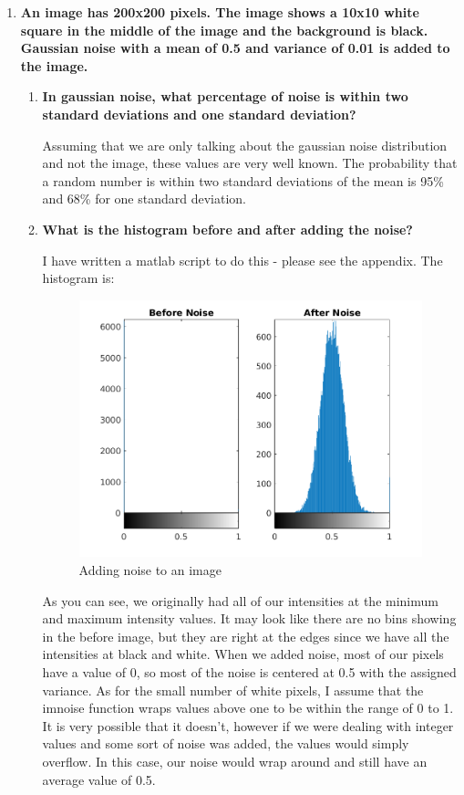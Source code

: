 \begin{enumerate}[font=\bfseries]

    \item \textbf{An image has 200x200 pixels. The image shows a 10x10 white
    square in the middle of the image and the background is black. Gaussian
    noise with a mean of 0.5 and variance of 0.01 is added to the image.}

    \begin{enumerate}[font=\bfseries, label=\alph*.]
	
	\item \textbf{In gaussian noise, what percentage of noise is within two
	standard deviations and one standard deviation?}

	Assuming that we are only talking about the gaussian noise distribution
	and not the image, these values are very well known. The probability
	that a random number is within two standard deviations of the mean is
	95\% and 68\% for one standard deviation.

	\item \textbf{What is the histogram before and after adding the noise?}

	I have written a matlab script to do this - please see the appendix. The
	histogram is:

	\begin{figure}[H]
	    \centering
	    \includegraphics{addnoise.png}
	    \caption{Adding noise to an image}
	\end{figure}

	As you can see, we originally had all of our intensities at the minimum
	and maximum intensity values. It may look like there are no bins showing
	in the before image, but they are right at the edges since we have all
	the intensities at black and white. When we added noise, most of our
	pixels have a value of 0, so most of the noise is centered at 0.5 with
	the assigned variance. As for the small number of white pixels, I assume
	that the imnoise function wraps values above one to be within the range
	of 0 to 1. It is very possible that it doesn't, however if we were
	dealing with integer values and some sort of noise was added, the values
	would simply overflow. In this case, our noise would wrap around and
	still have an average value of 0.5.
    

\end{enumerate}
\end{enumerate}

